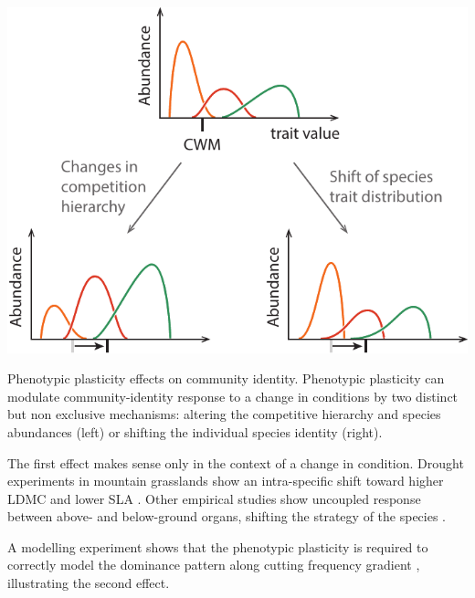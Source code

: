 \begin{marginfigure}
    \includegraphics{./1_Introduction/graphics/identity_shift.pdf}
  \caption[Identity shift]{Phenotypic plasticity effects on community identity. Phenotypic plasticity can modulate community-identity response to a change in conditions by two distinct but non exclusive mechanisms: altering the competitive hierarchy and species abundances (left) or shifting the individual species identity (right)\parencite{dwyer_specific_2014}.}
  \label{fg:insurance}
\end{marginfigure}

The first effect makes sense only in the context of a change in condition. Drought experiments in mountain grasslands show an intra-specific shift toward higher LDMC and lower SLA \parencite{jung_intraspecific_2014}. Other empirical studies show uncoupled response between above- and below-ground organs, shifting the strategy of the species \parencite{freschett_plasticity_2014}.

A modelling experiment shows that the phenotypic plasticity is required to correctly model the dominance pattern along cutting frequency gradient \parencite{maire_plasticity_2013}, illustrating the second effect. 




